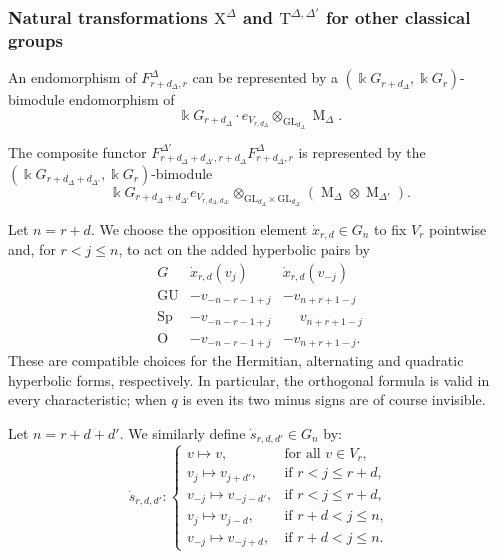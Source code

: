 \documentclass[12pt]{amsart}
\numberwithin{itemcounter}{subsection}
\theoremstyle{plain}
\theoremstyle{definition}
\theoremstyle{remark}
\numberwithin{equation}{section}
\def\k{\Bbbk}
\def\O{\mathrm{O}}
\def\Sp{\mathrm{Sp}}
\def\GL{\mathrm{GL}}
\def\GU{\mathrm{GU}}
\def\M{{\operatorname{M}\nolimits}}
\begin{document}
\subsubsection{Natural transformations $\mathrm{X}^\Delta$ and $\mathrm{T}^{\Delta,\Delta'}$ for other classical groups}

An endomorphism of $F^\Delta_{r+d_\Delta, r}$ can be represented by a $(\k G_{r+d_\Delta}, \k G_r)$-bimodule endomorphism of
\[
\k G_{r+d_\Delta}\cdot e_{V_{r,d_\Delta}} \otimes_{\GL_{d_\Delta}} \M_\Delta.
\]

The composite functor $F^{\Delta'}_{r+d_\Delta+d_{\Delta'},r+d_\Delta} F^\Delta_{r+d_\Delta, r}$ is represented by the $(\k G_{r+d_\Delta+d_{\Delta'}}, \k G_r)$-bimodule
\[
\k G_{r+d_\Delta+d_{\Delta'}} e_{V_{r,d_\Delta,d_{\Delta'}}} \otimes_{\GL_{d_\Delta} \times \GL_{d_{\Delta'}}} (\M_\Delta \otimes \M_{\Delta'}).
\]

Let $n=r+d$.  We choose the opposition element $\dot x_{r,d}\in G_n$
to fix $V_r$ pointwise and, for $r<j\le n$, to act on the added
hyperbolic pairs by
\[
\begin{array}{c|cc}
G & \dot x_{r,d}(v_j) & \dot x_{r,d}(v_{-j})\\ \hline
\GU & -v_{-n-r-1+j} & -v_{n+r+1-j}\\
\Sp & -v_{-n-r-1+j} & \phantom{-}v_{n+r+1-j}\\
\O  & -v_{-n-r-1+j} & -v_{n+r+1-j}.
\end{array}
\]
These are compatible choices for the Hermitian, alternating and quadratic
hyperbolic forms, respectively.  In particular, the orthogonal formula is
valid in every characteristic; when $q$ is even its two minus signs are of
course invisible.

Let $n = r + d + d'$. We similarly define $\dot{s}_{r,d,d'} \in G_n$ by:
\[
\dot{s}_{r,d,d'}:
\begin{cases}
v \mapsto v, & \text{for all } v \in V_r, \\
v_j \mapsto v_{j+d'}, & \text{if } r < j \leq r+d, \\
v_{-j} \mapsto v_{-j-d'}, & \text{if } r < j \leq r+d, \\
v_j \mapsto v_{j-d}, & \text{if } r+d < j \leq n, \\
v_{-j} \mapsto v_{-j+d}, & \text{if } r+d < j \leq n.
\end{cases}
\]
\end{document}
